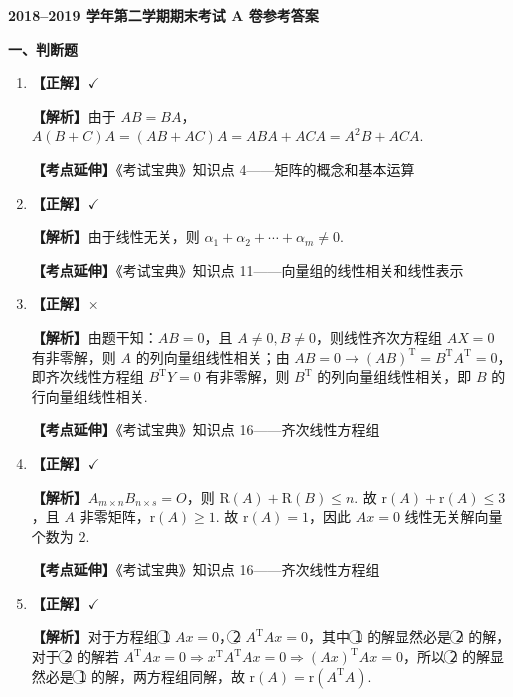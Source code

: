 \documentclass[a4paper,11pt]{ctexart}
\newcommand{\rk}{\mathrm{r}}
\newcommand{\R}{\mathrm{R}}
\newcommand{\T}{\mathrm{T}}
\begin{document}
\begin{center}
  {\Large\bfseries 2018--2019 学年第二学期期末考试 A 卷参考答案}
\end{center}

\vspace{0.8em}

\textbf{一、判断题}

\begin{enumerate}[label=\arabic*., leftmargin=2em, itemsep=0.6em, topsep=0.5em]
  \item \textbf{【正解】}$\checkmark$

  \textbf{【解析】}由于 $AB = BA$，$A(B + C)A = (AB + AC)A = ABA + ACA = A^2 B + ACA$.

  \textbf{【考点延伸】}《考试宝典》知识点 4——矩阵的概念和基本运算

  \item \textbf{【正解】}$\checkmark$

  \textbf{【解析】}由于线性无关，则 $\alpha_1 + \alpha_2 + \cdots + \alpha_m \neq 0$.

  \textbf{【考点延伸】}《考试宝典》知识点 11——向量组的线性相关和线性表示

  \item \textbf{【正解】}$\times$

  \textbf{【解析】}由题干知：$AB = 0$，且 $A \neq 0, B \neq 0$，则线性齐次方程组 $AX = 0$ 有非零解，则 $A$ 的列向量组线性相关；由 $AB = 0 \to (AB)^{\T} = B^{\T}A^{\T} = 0$，即齐次线性方程组 $B^{\T}Y = 0$ 有非零解，则 $B^{\T}$ 的列向量组线性相关，即 $B$ 的行向量组线性相关.

  \textbf{【考点延伸】}《考试宝典》知识点 16——齐次线性方程组

  \item \textbf{【正解】}$\checkmark$

  \textbf{【解析】}$A_{m \times n} B_{n \times s} = O$，则 $\R(A) + \R(B) \leqslant n$. 故 $\rk(A) + \rk(A) \leqslant 3$，且 $A$ 非零矩阵，$\rk(A) \geqslant 1$. 故 $\rk(A) = 1$，因此 $Ax = 0$ 线性无关解向量个数为 $2$.

  \textbf{【考点延伸】}《考试宝典》知识点 16——齐次线性方程组

  \item \textbf{【正解】}$\checkmark$

  \textbf{【解析】}对于方程组 \textcircled{\small 1} $Ax = 0$，\textcircled{\small 2} $A^{\T}Ax = 0$，其中 \textcircled{\small 1} 的解显然必是 \textcircled{\small 2} 的解，对于 \textcircled{\small 2} 的解若 $A^{\T}Ax = 0 \Rightarrow x^{\T}A^{\T}Ax = 0 \Rightarrow (Ax)^{\T}Ax = 0$，所以 \textcircled{\small 2} 的解显然必是 \textcircled{\small 1} 的解，两方程组同解，故 $\rk(A) = \rk(A^{\T}A)$.


\end{enumerate}
\end{document}
